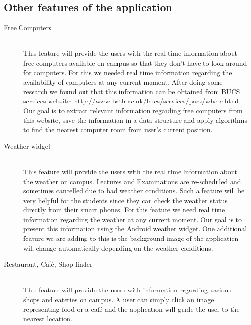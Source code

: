 \documentclass[10pt,a4paper,oneside]{report}
\begin{document}
\subsection*{Other features of the application}
\begin{description}
\item[Free Computers] \hfill \\
This feature will provide the users with the real time information about free computers available on campus so that they don't have to look around  for computers. For this we needed real time information regarding the availability of computers at any current moment. After doing some research we found out that this information can be obtained from BUCS services website: http://www.bath.ac.uk/bucs/services/pacs/where.html
Our goal is to extract relevant information regarding free computers from this website, save the information in a data structure and apply algorithms to find the nearest computer room from user's current position.
\item[Weather widget] \hfill \\
This feature will provide the users with the real time information about the weather on campus. Lectures and Examinations are re-scheduled and sometimes cancelled due to bad weather conditions. Such a feature will be very helpful for the students since they can check the weather status directly from their smart phones. For this feature we need real time information regarding the weather at any current moment. Our goal is to  present this information using the Android weather widget. One additional feature we are adding to this is the background image of the application will change automatically depending on the weather conditions.
\item[Restaurant, Café, Shop finder] \hfill \\
This feature will provide the users with information regarding various shops and eateries on campus. A user can simply click an image representing food or a café and the application will guide the user to the nearest location.
\end{description}
\end{document}
